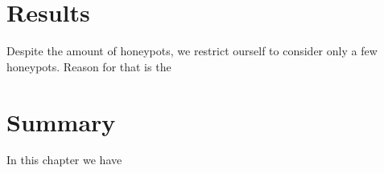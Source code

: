 





\section{Results}
\label{sec:honeypots-heicloud}



Despite the amount of honeypots, we restrict ourself to consider only a few honeypots.
Reason for that is the 

\section{Summary}

In this chapter we have